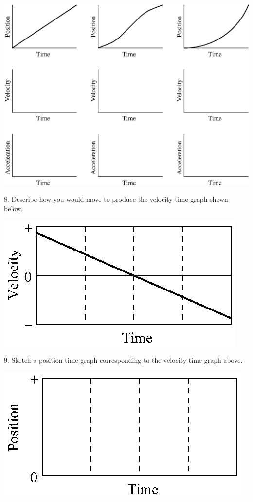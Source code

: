 \vspace{0.3cm}
{\par\centering \includegraphics{slowing/slowing_fig11.eps} \par}
\vspace{0.3cm}

8. Describe how you would move to produce the velocity-time graph shown below.

\vspace{0.3cm}
{\par\raggedright \includegraphics{slowing/slowing_fig12.eps} \par}
\vspace{0.3cm}

9. Sketch a position-time graph corresponding to the velocity-time graph above.

\vspace{0.3cm}
{\par\centering \includegraphics{slowing/slowing_fig13.eps} \par}
\vspace{0.3cm}

